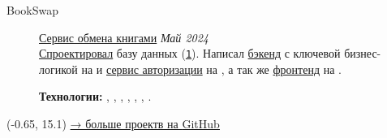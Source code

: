 \documentclass[margin,line]{resume}
\begin{document}
\begin{resume}
  \begin{description}

    \item[BookSwap]\small{\href{https://github.com/alchemmist/bookswap}{Сервис
        обмена книгами} \hfill
      \textsl{Май 2024\vspace{1mm}}}\\
      \href{https://github.com/alchemmist/bookswap/blob/dev/docs/database.md}{Спроектировал}
      базу данных
      (\href{https://github.com/alchemmist/bookswap/blob/dev/backend/src/main/resources/schema.sql}{\texttt{1}}).
      Написал
      \href{https://github.com/alchemmist/bookswap/tree/dev/backend}{бэкенд}
      с ключевой бизнес-логикой на  и
      \href{https://github.com/alchemmist/bookswap/tree/dev/auth-service}{сервис
      авторизации} на , а так же
      \href{https://github.com/alchemmist/bookswap/tree/dev/frontend}{фронтенд}
      на
      .

      \textbf{Технологии:} ,
      , 
      , , ,
      , .

  \end{description}
\end{resume}

\begin{minipage}[H]{9.18\textwidth}
  \begin{textblock}{7}(-0.65, 15.1)
    \begingroup
    \hspace{35mm}
    \hypersetup{urlcolor=gray!90}
    \large
    \href{https://github.com/alchemmist}{→ больше проектв на \underline{GitHub}}
    \endgroup
  \end{textblock}

\end{minipage}

\clearpage
\end{document}
